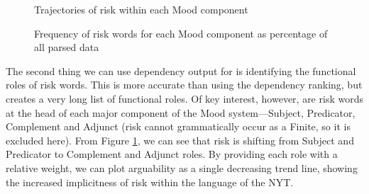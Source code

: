 			\begin{figure}[htb!]
			\centering
			\caption{Trajectories of risk within each Mood component}
			\label{fig:interpersonalarg}
			\end{figure}

			\begin{figure}[htb!]
			\centering
			\caption{Frequency of risk words for each Mood component as percentage of all parsed data}
			\label{fig:reladj}
			\end{figure}

			The second thing we can use dependency output for is identifying the functional roles of risk words. This is more accurate than using the dependency ranking, but creates a very long list of functional roles. Of key interest, however, are risk words at the head of each major component of the Mood system---Subject, Predicator, Complement and Adjunct (risk cannot grammatically occur as a Finite, so it is excluded here). From Figure \ref{fig:interpersonalarg}, we can see that risk is shifting from Subject and Predicator to Complement and Adjunct roles. By providing each role with a relative weight, we can plot arguability as a single decreasing trend line, showing the increased implicitness of risk within the language of the NYT.


